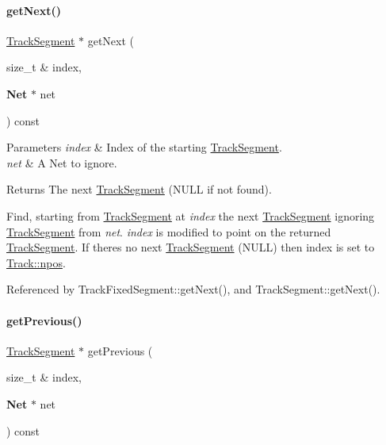 \paragraph{\texorpdfstring{get\+Next()}{getNext()}}
{\footnotesize\ttfamily \hyperlink{classKite_1_1TrackSegment}{Track\+Segment} $\ast$ get\+Next (\begin{DoxyParamCaption}\item[{size\+\_\+t \&}]{index,  }\item[{\textbf{ Net} $\ast$}]{net }\end{DoxyParamCaption}) const}


\begin{DoxyParams}{Parameters}
{\em index} & Index of the starting \hyperlink{classKite_1_1TrackSegment}{Track\+Segment}. \\
\hline
{\em net} & A {\ttfamily Net} to ignore. \\
\hline
\end{DoxyParams}
\begin{DoxyReturn}{Returns}
The next \hyperlink{classKite_1_1TrackSegment}{Track\+Segment} ({\ttfamily N\+U\+LL} if not found).
\end{DoxyReturn}
Find, starting from \hyperlink{classKite_1_1TrackSegment}{Track\+Segment} at {\itshape index} the next \hyperlink{classKite_1_1TrackSegment}{Track\+Segment} ignoring \hyperlink{classKite_1_1TrackSegment}{Track\+Segment} from {\itshape net}. {\itshape index} is modified to point on the returned \hyperlink{classKite_1_1TrackSegment}{Track\+Segment}. If there\textquotesingle{}s no next \hyperlink{classKite_1_1TrackSegment}{Track\+Segment} ({\ttfamily N\+U\+LL}) then index is set to \hyperlink{classKite_1_1Track_ae0070ea45b2592ce3701ab9e486e58a0}{Track\+::npos}. 

Referenced by Track\+Fixed\+Segment\+::get\+Next(), and Track\+Segment\+::get\+Next().

\mbox{\label{classKite_1_1Track_a290fcfe6131730d216951a3b5207d777}} 
\paragraph{\texorpdfstring{get\+Previous()}{getPrevious()}}
{\footnotesize\ttfamily \hyperlink{classKite_1_1TrackSegment}{Track\+Segment} $\ast$ get\+Previous (\begin{DoxyParamCaption}\item[{size\+\_\+t \&}]{index,  }\item[{\textbf{ Net} $\ast$}]{net }\end{DoxyParamCaption}) const}


